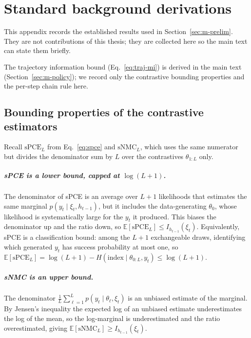 
\chapter{Standard background derivations}
\label{app:background}

This appendix records the established results used in Section~\ref{sec:m-prelim}.
They are not contributions of this thesis; they are collected here so the main text
can state them briefly.

The trajectory information bound (Eq.~\eqref{eq:traj-mi}) is derived in the main text
(Section~\ref{sec:m-policy}); we record only the contrastive bounding properties and
the per-step chain rule here.

\section{Bounding properties of the contrastive estimators}
\label{app:bounds}

Recall $\mathrm{sPCE}_L$ from Eq.~\eqref{eq:spce} and $\mathrm{sNMC}_L$, which uses
the same numerator but divides the denominator sum by $L$ over the contrastives
$\theta_{1:L}$ only.

\paragraph{sPCE is a lower bound, capped at $\log(L+1)$.}
The denominator of sPCE is an average over $L+1$ likelihoods that estimates the
same marginal $p(y_t\mid\xi_t,h_{t-1})$, but it includes the data-generating
$\theta_0$, whose likelihood is systematically large for the $y_t$ it produced.
This biases the denominator up and the ratio down, so
$\mathbb{E}[\mathrm{sPCE}_L]\le I_{h_{t-1}}(\xi_t)$. Equivalently, sPCE is a
classification bound: among the $L+1$ exchangeable draws, identifying which
generated $y_t$ has success probability at most one, so
$\mathbb{E}[\mathrm{sPCE}_L]=\log(L+1)-H(\text{index}\mid\theta_{0:L},y_t)\le\log(L+1)$.

\paragraph{sNMC is an upper bound.}
The denominator $\frac1L\sum_{\ell=1}^L p(y_t\mid\theta_\ell,\xi_t)$ is an unbiased
estimate of the marginal. By Jensen's inequality the expected log of an unbiased
estimate underestimates the log of the mean, so the log-marginal is underestimated
and the ratio overestimated, giving $\mathbb{E}[\mathrm{sNMC}_L]\ge I_{h_{t-1}}(\xi_t)$.

